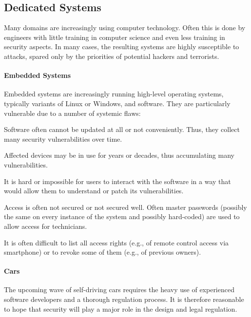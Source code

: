 \subsection{Dedicated Systems}

Many domains are increasingly using computer technology.
Often this is done by engineers with little training in computer science and even less training in security aspects.
In many cases, the resulting systems are highly susceptible to attacks, spared only by the priorities of potential hackers and terrorists.

\paragraph{Embedded Systems}
Embedded systems are increasingly running high-level operating systems, typically variants of Linux or Windows, and software.
They are particularly vulnerable due to a number of systemic flaws:
\begin{compactitem}
\item Software often cannot be updated at all or not conveniently. Thus, they collect many security vulnerabilities over time.
\item Affected devices may be in use for years or decades, thus accumulating many vulnerabilities.
\item It is hard or impossible for users to interact with the software in a way that would allow them to understand or patch its vulnerabilities.
\item Access is often not secured or not secured well.
Often master passwords (possibly the same on every instance of the system and possibly hard-coded) are used to allow access for technicians.
\item It is often difficult to list all access rights (e.g., of remote control access via smartphone) or to revoke some of them (e.g., of previous owners).
\end{compactitem}


\paragraph{Cars}
The upcoming wave of self-driving cars requires the heavy use of experienced software developers and a thorough regulation process.
It is therefore reasonable to hope that security will play a major role in the design and legal regulation.

